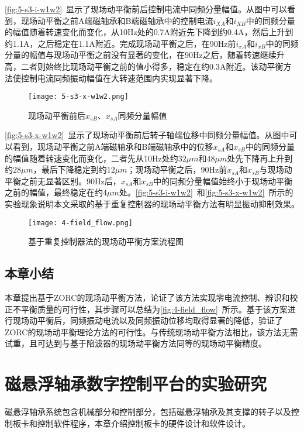 \documentclass[
  lang=cn,
  degree=master,
  openany,oneside
]{nuaathesis}
\begin{document}
\autoref{fig:5-s3-i-w1w2}~显示了现场动平衡前后控制电流中同频分量幅值。从图中可以看到，现场动平衡之前A端磁轴承和B端磁轴承中的控制电流$i_{XA}$和$i_{XB}$中的同频分量的幅值随着转速变化而变化，从10Hz处的0.7A附近先下降到约0.4A，然后上升到约1.1A，之后稳定在1.1A附近。完成现场动平衡之后，在90Hz前$i_{xA}$和$i_{xB}$中的同频分量的幅值与现场动平衡之前没有显著的变化，在90Hz之后，随着转速继续升高，二者则始终比现场动平衡之前的值小得多，稳定在约0.3A附近。该动平衡方法使控制电流同频振动幅值在大转速范围内实现显著下降。

\begin{figure}[h!]
	\texttt{[image: 5-s3-x-w1w2.png]}
	\caption{现场动平衡前后$x_{sB}$、$x_{sA}$同频分量幅值}
	\label{fig:5-s3-x-w1w2}
\end{figure}

\autoref{fig:5-s3-x-w1w2}~显示了现场动平衡前后转子轴端位移中同频分量幅值。从图中可以看到，现场动平衡之前A端磁轴承和B端磁轴承中的位移$x_{sA}$和$x_{sB}$中的同频分量的幅值随着转速变化而变化，二者先从10Hz处约$32 \mu m$和$48 \mu m$处先下降再上升到约$28\mu m$，最后下降稳定到约$12 \mu m$；现场动平衡之后，90Hz前$x_{sA}$和$x_{sB}$与现场动平衡之前无显著区别。90Hz后，$x_{sA}$和$x_{sB}$中的同频分量幅值始终小于现场动平衡之前的幅值，最终稳定在约$4 \mu m$处。\autoref{fig:5-s3-i-w1w2}~和\autoref{fig:5-s3-x-w1w2}~所示的实验现象说明本文采取的基于重复控制器的现场动平衡方法有明显振动抑制效果。

\begin{figure}[h!]
	\texttt{[image: 4-field\_flow.png]}
	\caption{基于重复控制器法的现场动平衡方案流程图}
	\label{fig:4-field_flow}
\end{figure}	

\section{本章小结}
本章提出基于ZORC的现场动平衡方法，论证了该方法实现零电流控制、辨识和校正不平衡质量的可行性，其步骤可以总结为\autoref{fig:4-field_flow}~所示。基于该方案进行现场动平衡后，同频振动电流以及同频振动位移均取得显著的降低，验证了ZORC的现场动平衡理论方法的可行性。与传统现场动平衡方法相比，该方法无需试重，且可达到与基于陷波器的现场动平衡方法同等的现场动平衡精度。

\chapter{磁悬浮轴承数字控制平台的实验研究}
磁悬浮轴承系统包含机械部分和控制部分，包括磁悬浮轴承及其支撑的转子以及控制板卡和控制软件程序，本章介绍控制板卡的硬件设计和软件设计。
\end{document}
